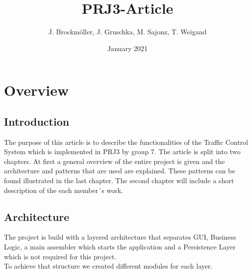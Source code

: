 \documentclass{report}
\title{PRJ3-Article}
\author{J. Brockmöller, J. Gruschka, M. Sajonz, T. Weigand}
\date{January 2021}
\begin{document}
    \maketitle
    \newpage

    \chapter{Overview}


    \section{Introduction}
    The purpose of this article is to describe the functionalities of the Traffic Control System which is implemented in PRJ3 by group 7.
    The article is split into two chapters. At first a general overview of the entire project is given and the architecture and patterns that are used are explained. These patterns can be found illustrated in the last chapter. The second chapter will include a short description of the each member´s work.

    \section{Architecture}
    The project is build with a layered architecture that separates GUI, Business Logic, a main assembler which starts the application and a Persistence Layer which is not required for this project.\\
    To achieve that structure we created different modules for each layer.
\end{document}
